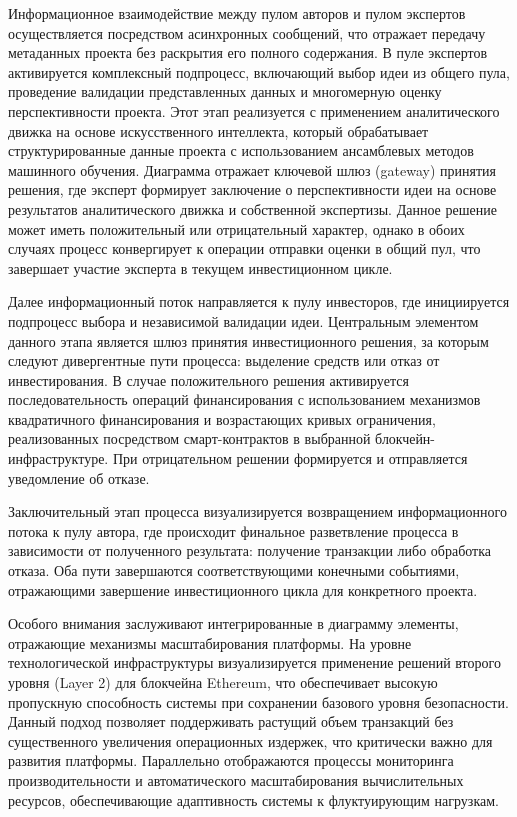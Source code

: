 \documentclass[
    14pt,
    specialist,
    candidate, %
    subf, %
    href,
    dotsinheaders=false
]{disser}
\begin{document}
Информационное взаимодействие между пулом авторов и пулом экспертов осуществляется посредством асинхронных сообщений, что отражает передачу метаданных проекта без раскрытия его полного содержания. В пуле экспертов активируется комплексный подпроцесс, включающий выбор идеи из общего пула, проведение валидации представленных данных и многомерную оценку перспективности проекта. Этот этап реализуется с применением аналитического движка на основе искусственного интеллекта, который обрабатывает структурированные данные проекта с использованием ансамблевых методов машинного обучения. Диаграмма отражает ключевой шлюз (gateway) принятия решения, где эксперт формирует заключение о перспективности идеи на основе результатов аналитического движка и собственной экспертизы. Данное решение может иметь положительный или отрицательный характер, однако в обоих случаях процесс конвергирует к операции отправки оценки в общий пул, что завершает участие эксперта в текущем инвестиционном цикле.

Далее информационный поток направляется к пулу инвесторов, где инициируется подпроцесс выбора и независимой валидации идеи. Центральным элементом данного этапа является шлюз принятия инвестиционного решения, за которым следуют дивергентные пути процесса: выделение средств или отказ от инвестирования. В случае положительного решения активируется последовательность операций финансирования с использованием механизмов квадратичного финансирования и возрастающих кривых ограничения, реализованных посредством смарт-контрактов в выбранной блокчейн-инфраструктуре. При отрицательном решении формируется и отправляется уведомление об отказе.

Заключительный этап процесса визуализируется возвращением информационного потока к пулу автора, где происходит финальное разветвление процесса в зависимости от полученного результата: получение транзакции либо обработка отказа. Оба пути завершаются соответствующими конечными событиями, отражающими завершение инвестиционного цикла для конкретного проекта.

Особого внимания заслуживают интегрированные в диаграмму элементы, отражающие механизмы масштабирования платформы. На уровне технологической инфраструктуры визуализируется применение решений второго уровня (Layer 2) для блокчейна Ethereum, что обеспечивает высокую пропускную способность системы при сохранении базового уровня безопасности. Данный подход позволяет поддерживать растущий объем транзакций без существенного увеличения операционных издержек, что критически важно для развития платформы. Параллельно отображаются процессы мониторинга производительности и автоматического масштабирования вычислительных ресурсов, обеспечивающие адаптивность системы к флуктуирующим нагрузкам.
\end{document}
